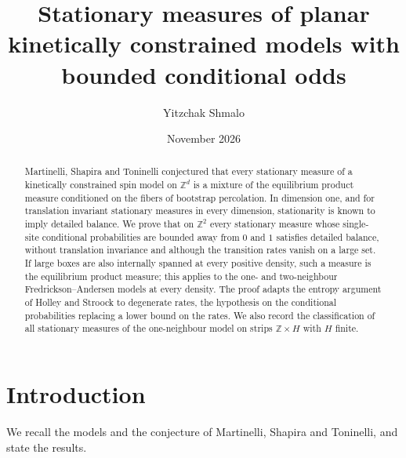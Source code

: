 \documentclass[11pt]{amsart}
\title[Stationary measures of planar kinetically constrained models]{Stationary measures of planar kinetically
constrained models with bounded conditional odds}
\author{Yitzchak Shmalo}
\date{November 2026}
\theoremstyle{remark}
\newcommand{\Z}{\mathbb{Z}}
\begin{document}
\begin{abstract}
Martinelli, Shapira and Toninelli conjectured that every stationary measure of a kinetically constrained spin model
on $\Z^d$ is a mixture of the equilibrium product measure conditioned on the fibers of bootstrap percolation. In
dimension one, and for translation invariant stationary measures in every dimension, stationarity is known to imply detailed
balance. We prove that on $\Z^2$ every stationary measure whose single-site conditional probabilities are bounded away
from $0$ and $1$ satisfies detailed balance, without translation invariance and although the transition rates vanish
on a large set. If large boxes are also internally spanned at every positive density, such a measure is the
equilibrium product measure; this applies to the one- and two-neighbour Fredrickson--Andersen models at every density.
The proof adapts the entropy argument of Holley and Stroock to degenerate rates, the hypothesis on the conditional
probabilities replacing a lower bound on the rates. We also record the classification of all stationary measures of
the one-neighbour model on strips $\Z\times H$ with $H$ finite.
\end{abstract}
\maketitle

\section{Introduction}\label{sec:intro}

We recall the models and the conjecture of Martinelli, Shapira and Toninelli, and state the results.
\end{document}
